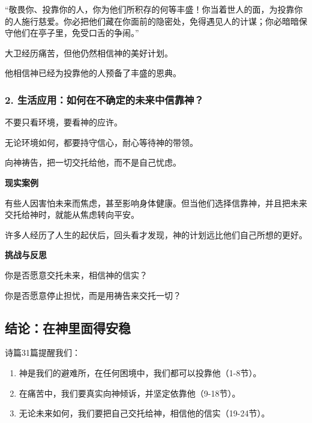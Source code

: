 \documentclass[a4paper, 12pt]{article}
\begin{document}
“敬畏你、投靠你的人，你为他们所积存的何等丰盛！你当着世人的面，为投靠你的人施行慈爱。你必把他们藏在你面前的隐密处，免得遇见人的计谋；你必暗暗保守他们在亭子里，免受口舌的争闹。”

大卫经历痛苦，但他仍然相信神的美好计划。

他相信神已经为投靠他的人预备了丰盛的恩典。
\subsubsection*{2. 生活应用：如何在不确定的未来中信靠神？}

\hspace{0.6cm}不要只看环境，要看神的应许。

无论环境如何，都要持守信心，耐心等待神的带领。

向神祷告，把一切交托给他，而不是自己忧虑。

\vspace{0.2cm}

\textbf{现实案例}

\hspace{0.6cm}有些人因害怕未来而焦虑，甚至影响身体健康。但当他们选择信靠神，并且把未来交托给神时，就能从焦虑转向平安。

\hspace{0.6cm}
许多人经历了人生的起伏后，回头看才发现，神的计划远比他们自己所想的更好。

\vspace{0.2cm}

\textbf{挑战与反思}

\hspace{0.6cm}你是否愿意交托未来，相信神的信实？

\hspace{0.6cm}你是否愿意停止担忧，而是用祷告来交托一切？
\subsection*{结论：在神里面得安稳}
\hspace{0.6cm}诗篇31篇提醒我们：
\begin{enumerate}
    \leftskip=0.7cm
    \item 神是我们的避难所，在任何困境中，我们都可以投靠他（1-8节）。
    \item 在痛苦中，我们要真实向神倾诉，并坚定依靠他（9-18节）。

    \item 无论未来如何，我们要把自己交托给神，相信他的信实（19-24节）。

\end{enumerate}
\end{document}
